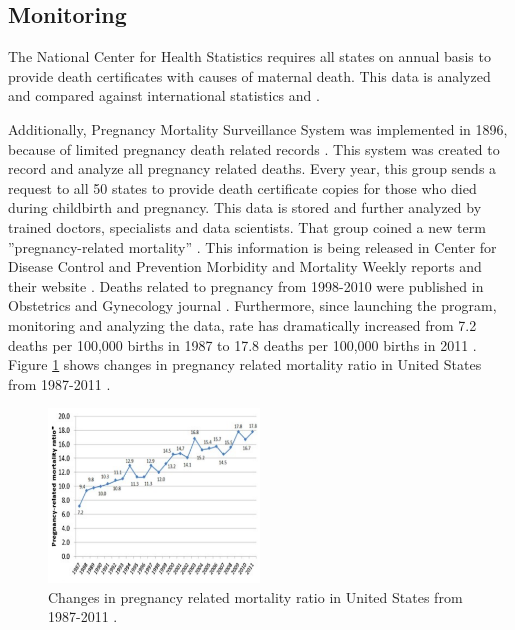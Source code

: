 \documentclass[sigconf]{acmart}
\begin{document}
\subsection{Monitoring}

The National Center for Health Statistics requires all states on annual basis to provide death certificates with causes of maternal death. This data is analyzed and compared against international statistics \cite{hoyert2007maternal} and \cite{creanga2014maternal}.

Additionally, Pregnancy Mortality Surveillance System was implemented in 1896, because of limited pregnancy death related records  \cite{horon2011effectiveness}. This system was created to record and analyze all pregnancy related deaths. Every year, this group sends a request to all 50 states to provide death certificate copies for those who died during childbirth and pregnancy. This data is stored and further analyzed by trained doctors, specialists and data scientists. That group coined a new term ''pregnancy-related mortality'' \cite{callaghan2012overview}. This information is being released in Center for Disease Control and Prevention Morbidity and Mortality Weekly reports and their website \cite{neggers2016trends}. Deaths related to pregnancy from 1998-2010 were published in Obstetrics and Gynecology journal \cite{schulz1994assessing}. Furthermore, since launching the program, monitoring and analyzing the data, rate has dramatically increased from 7.2 deaths per 100,000 births in 1987 to 17.8 deaths per 100,000 births in 2011 \cite{neggers2016trends}. Figure \ref{fig:figure3} shows changes in pregnancy related mortality ratio in United States from 1987-2011 \cite{centers2014pregnancyrelated}.

\begin{figure}
  \centering
  \includegraphics[width=0.5\textwidth]{images/figure3.pdf}
  \caption{Changes in pregnancy related mortality ratio in United States from 1987-2011 \cite{centers2014pregnancyrelated}.} \label{fig:figure3} 
\end{figure}
\end{document}
